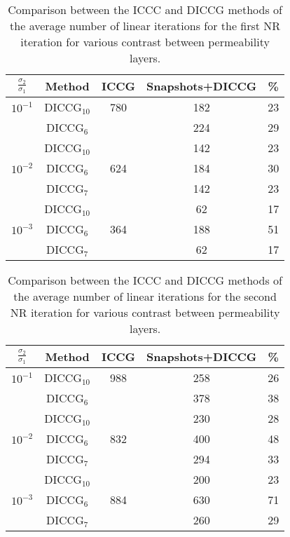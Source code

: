 \documentclass[12pt]{article}
\numberwithin{equation}{section}
\begin{document}
\begin{table}[!ht]\centering
\begin{minipage}{1\textwidth}
\vspace{-10pt}
\centering
\begin{tabular}{ |c|c|c|c|c|} 

\hline
$\frac{\sigma_2}{\sigma_1}$&Method& ICCG & Snapshots+DICCG &\% \\
\hline
$10^{-1}$ &DICCG$_{10}$&780 &  182&23\\
 &DICCG$_6$& &  224&29\\
 \hline
 &DICCG$_{10}$& &  142&23\\
$10^{-2}$ &DICCG$_6$& 624&  184&30\\
          &DICCG$_7$&& 142 &23\\
          \hline
          &DICCG$_{10}$& &  62& 17\\
$10^{-3}$ &DICCG$_6$&364 &  188& 51\\
          &DICCG$_7$&&  62&17 \\
 \hline
 \end{tabular}
\caption{Comparison between the ICCC and DICCG methods of the average number of linear iterations for the first NR iteration for various contrast between permeability layers. }\label{table:litertot1}
\end{minipage}
\end{table}
\begin{table}
\begin{minipage}{1\textwidth}
\vspace{-10pt}
\centering
\begin{tabular}{ |c|c|c|c|c|} 

\hline
$\frac{\sigma_2}{\sigma_1}$&Method& ICCG & Snapshots+DICCG &\% \\
\hline
$10^{-1}$ &DICCG$_{10}$& 988&  258& 26\\
&DICCG$_6$& &  378& 38\\
\hline
&DICCG$_{10}$& &  230&28\\
$10^{-2}$ &DICCG$_6$& 832&  400&48\\
&DICCG$_7$&&  294&33\\
\hline
&DICCG$_{10}$&&  200&23 \\
$10^{-3}$ &DICCG$_6$&884&  630&71 \\
&DICCG$_7$& &  260& 29\\
 \hline
 \end{tabular}
\caption{Comparison between the ICCC and DICCG methods of the average number of linear iterations for the second NR iteration for various contrast between permeability layers. }\label{table:litertot2}
\end{minipage}
\end{table}
\end{document}
